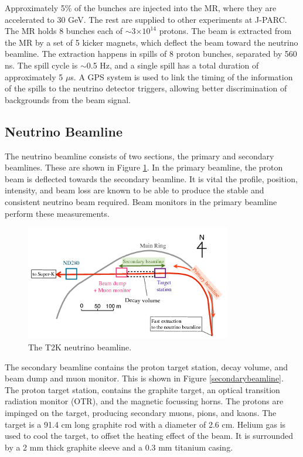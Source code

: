 Approximately 5$\%$ of the bunches are injected into the MR, where they are accelerated to 30 GeV. The rest are supplied to other experiments at J-PARC. The MR holds 8 bunches each of $\sim$3$\times10^{14}$ protons. The beam is extracted from the MR by a set of 5 kicker magnets, which deflect the beam toward the neutrino beamline. The extraction happens in spills of 8 proton bunches, separated by 560 ns. The spill cycle is $\sim$0.5 Hz, and a single spill has a total duration of approximately 5 $\mu$s. A GPS system is used to link the timing of the information of the spills to the neutrino detector triggers, allowing better discrimination of backgrounds from the beam signal.

\subsection{Neutrino Beamline}

The neutrino beamline consists of two sections, the primary and secondary beamlines. These are shown in Figure \ref{beamline}. In the primary beamline, the proton beam is deflected towards the secondary beamline. It is vital the profile, position, intensity, and beam loss are known to be able to produce the stable and consistent neutrino beam required. Beam monitors in the primary beamline perform these measurements. 

\begin{figure}[!htbp]
\centering
\includegraphics*[width=0.8\textwidth,clip]{figs/beamline}
\caption{The T2K neutrino beamline.} \label{beamline}
\end{figure}

The secondary beamline contains the proton target station, decay volume, and beam dump and muon monitor. This is shown in Figure \ref{secondarybeamline}. The proton target station, contains the graphite target, an optical transition radiation monitor (OTR), and the magnetic focussing horns. The protons are impinged on the target, producing secondary muons, pions, and kaons. The target is a 91.4 cm long graphite rod with a diameter of 2.6 cm. Helium gas is used to cool the target, to offset the heating effect of the beam. It is surrounded by a 2 mm thick graphite sleeve and a 0.3 mm titanium casing. 

